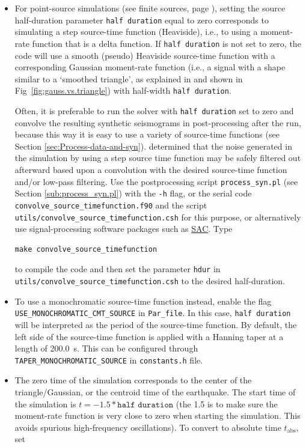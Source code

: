 \begin{itemize}
\item For point-source simulations (see finite sources, page \pageref{To-simulate-a}),
setting the source half-duration parameter \texttt{half duration} equal to zero corresponds to simulating a step source-time
function (Heaviside), i.e., to using a moment-rate function that is a delta function. If
\texttt{half duration} is not set to zero, the code will use a smooth (pseudo) Heaviside source-time function
with a corresponding Gaussian moment-rate function
(i.e., a signal with a shape similar to a `smoothed triangle', as
explained in \citet{KoTr02a} and shown in Fig~\ref{fig:gauss.vs.triangle})
with half-width \texttt{half duration}.

Often, it is preferable to run the solver with \texttt{half duration} set to zero and convolve
the resulting synthetic seismograms in post-processing after the run,
because this way it is easy to use a variety of source-time functions
(see Section \ref{sec:Process-data-and-syn}). \citet{KoTr02a} determined
that the noise generated in the simulation by using a step source
time function may be safely filtered out afterward based upon a convolution
with the desired source-time function and/or low-pass filtering. Use
the postprocessing script \texttt{process\_syn.pl} (see Section \ref{sub:process_syn.pl})
with the \texttt{-h} flag, or the serial code \texttt{convolve\_source\_timefunction.f90}
and the script \texttt{utils/convolve\_source\_timefunction.csh} for
this purpose, or alternatively use signal-processing software packages
such as \href{http://www.iris.edu/software/sac/}{SAC}. Type
\begin{verbatim}
make convolve_source_timefunction
\end{verbatim}
to compile the code and then set the parameter \texttt{hdur} in \texttt{utils/convolve\_source\_timefunction.csh}
to the desired half-duration.

\item To use a monochromatic source-time function instead, enable the flag \texttt{USE\_MONOCHROMATIC\_CMT\_SOURCE} in \texttt{Par\_file}. In this case, \texttt{half
duration} will be interpreted as the period of the source-time function. By default, the left side of the source-time function is applied with a Hanning taper at a length of 200.0~s. This can be configured through \texttt{TAPER\_MONOCHROMATIC\_SOURCE} in \texttt{constants.h} file.

\item The zero time of the simulation corresponds to the center of the triangle/Gaussian,
or the centroid time of the earthquake. The start time of the simulation
is $t=-1.5*\texttt{half duration}$ (the 1.5 is to make sure the moment-rate function is very close to zero
when starting the simulation. This avoids spurious high-frequency oscillations).
To convert to absolute time $t_{\mathrm{abs}}$, set


\end{itemize}
